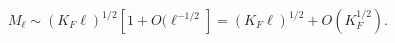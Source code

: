 \begin{equation}
\label{correct}
M_{\ell}\sim (K_F\ell )^{1/2}[1+O(\ell^{-1/2}]=(K_F\ell )^{1/2}+O(K_F^{1/2}).
\end{equation}

